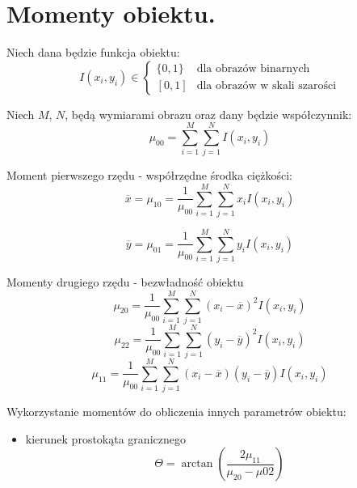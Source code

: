 \documentclass[a4paper,10pt]{article}
\begin{document}
\section{Momenty obiektu.}
Niech dana będzie funkcja obiektu:
\begin{equation}
 I(x_i, y_i) \in 
\begin{cases}
 \{0, 1\} & \mbox{dla obrazów binarnych}\\
 \left[0, 1\right] & \mbox{dla obrazów w skali szarości}
\end{cases}
\end{equation}

Niech $M$, $N$, będą wymiarami obrazu oraz dany będzie współczynnik:
\begin{equation}
  \mu_{00} = \sum_{i=1}^{M} \sum_{j=1}^{N} I(x_i, y_i)
\end{equation}

Moment pierwszego rzędu - współrzędne środka ciężkości:
\begin{equation}
  \overline{x} = \mu_{10} = \frac{1}{\mu_{00}} \sum_{i=1}^{M} \sum_{j=1}^{N} x_i I(x_i, y_i)
\end{equation}

\begin{equation}
  \overline{y} = \mu_{01} = \frac{1}{\mu_{00}} \sum_{i=1}^{M} \sum_{j=1}^{N} y_i I(x_i, y_i)
\end{equation}

Momenty drugiego rzędu - bezwładność obiektu
\begin{equation}
  \mu_{20} = \frac{1}{\mu_{00}} \sum_{i=1}^{M} \sum_{j=1}^{N} (x_i - \overline{x})^2 I(x_i, y_i)
\end{equation}
\begin{equation}
  \mu_{22} = \frac{1}{\mu_{00}} \sum_{i=1}^{M} \sum_{j=1}^{N} (y_i - \overline{y})^2 I(x_i, y_i)
\end{equation}
\begin{equation}
  \mu_{11} = \frac{1}{\mu_{00}} \sum_{i=1}^{M} \sum_{j=1}^{N} (x_i - \overline{x})(y_i - \overline{y}) I(x_i, y_i)
\end{equation}

Wykorzystanie momentów do obliczenia innych parametrów obiektu:
\begin{itemize}
 \item kierunek prostokąta granicznego
 \begin{equation}
   \Theta = \arctan \left(\frac{2 \mu_{11}}{\mu_{20} - \mu{02}}\right)
 \end{equation}
\end{itemize}
\end{document}
